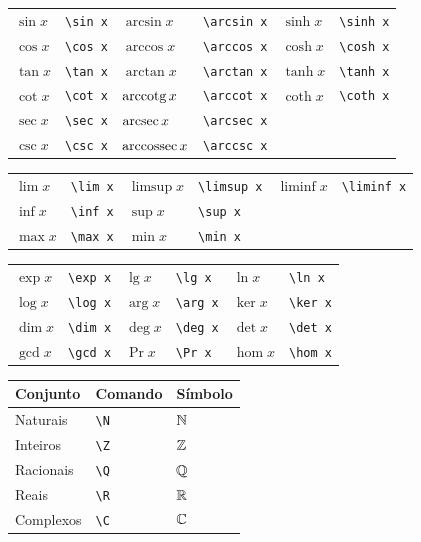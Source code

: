\documentclass[fleqn]{profmat-cefet}
\begin{document}
\begin{spacing}{1}
\begin{longtable}{p{16mm}p{25mm}p{16mm}p{25mm}p{16mm}p{20mm}} \hline
  $\sin x$ & \lstinline!\sin x! &     $\arcsin x$ & \lstinline!\arcsin x! &     $\sinh x$ & \lstinline!\sinh x! \\
  $\cos x$ & \lstinline!\cos x! &     $\arccos x$ & \lstinline!\arccos x! &     $\cosh x$ & \lstinline!\cosh x! \\
  $\tan x$ & \lstinline!\tan x! &     $\arctan x$ & \lstinline!\arctan x! &     $\tanh x$ & \lstinline!\tanh x! \\
  $\cot x$ & \lstinline!\cot x! &     $\operatorname{arccotg} x$ & \lstinline!\arccot x! &     $\coth x$ & \lstinline!\coth x! \\
  $\sec x$ & \lstinline!\sec x! &     $\operatorname{arcsec} x$ & \lstinline!\arcsec x! \\
  $\csc x$ & \lstinline!\csc x! &     $\operatorname{arccossec} x$ & \lstinline!\arccsc x! \\ \hline
\end{longtable}        

\begin{longtable}{p{16mm}p{25mm}p{16mm}p{25mm}p{16mm}p{20mm}} \hline
  $\lim x$ & \lstinline!\lim x! &     $\limsup x$ & \lstinline!\limsup x! &     $\liminf x$ & \lstinline!\liminf x! \\
  $\inf x$ & \lstinline!\inf x! &     $\sup x$ & \lstinline!\sup x! \\
  $\max x$ & \lstinline!\max x! &     $\min x$ & \lstinline!\min x! \\ \hline
\end{longtable}        

\begin{longtable}{p{16mm}p{25mm}p{16mm}p{25mm}p{16mm}p{20mm}} \hline
  $\exp x$ & \lstinline!\exp x! &
  $\lg  x$ & \lstinline!\lg x!  &
  $\ln  x$ & \lstinline!\ln x!  \\
  $\log x$ & \lstinline!\log x! &
  $\arg x$ & \lstinline!\arg x! &
  $\ker x$ & \lstinline!\ker x! \\
  $\dim x$ & \lstinline!\dim x! &
  $\deg x$ & \lstinline!\deg x! &
  $\det x$ & \lstinline!\det x! \\
  $\gcd x$ & \lstinline!\gcd x! &
  $\Pr  x$ & \lstinline!\Pr x!  &
  $\hom x$ & \lstinline!\hom x! \\ \hline
\end{longtable}        

\begin{longtable}{p{30mm}p{30mm}p{30mm}}  \hline
  Conjunto  &    Comando     & Símbolo \\ \hline
  \endhead
  Naturais  & \lstinline!\N! &  $\mathbb{N}$   \\
  Inteiros  & \lstinline!\Z! &  $\mathbb{Z}$   \\
  Racionais & \lstinline!\Q! &  $\mathbb{Q}$   \\
  Reais     & \lstinline!\R! &  $\mathbb{R}$   \\
  Complexos & \lstinline!\C! &  $\mathbb{C}$   \\ \hline
\end{longtable}


\end{spacing}
\end{document}
